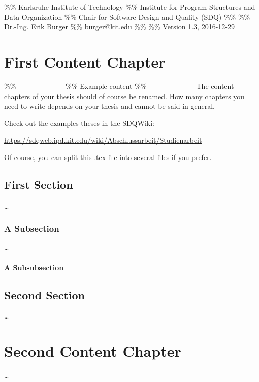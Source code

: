 \%\% Karlsruhe Institute of Technology \%\% Institute for Program
Structures and Data Organization \%\% Chair for Software Design and
Quality (SDQ) \%\% \%\% Dr.-Ing. Erik Burger \%\% burger@kit.edu \%\%
\%\% Version 1.3, 2016-12-29

\chapter{First Content Chapter}
\label{ch:FirstContent}

\%\% ------------------- \%\% \textbar{} Example content \textbar{} \%\%
------------------- The content chapters of your thesis should of course
be renamed. How many chapters you need to write depends on your thesis
and cannot be said in general.

Check out the examples theses in the SDQWiki:

\url{https://sdqweb.ipd.kit.edu/wiki/Abschlussarbeit/Studienarbeit}

Of course, you can split this .tex file into several files if you
prefer.

\section{First Section}
\label{sec:FirstContent:FirstSection}

\dots

\subsection{A Subsection}
\label{sec:FirstContent:FirstSubSection}

\dots

\subsubsection{A Subsubsection}

\section{Second Section}
\label{sec:FirstContent:SecondSection}

\dots

\chapter{Second Content Chapter}
\label{ch:SecondContent}

\dots

